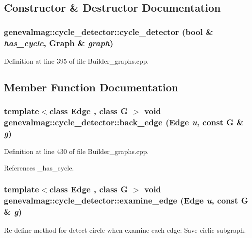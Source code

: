 \subsection{Constructor \& Destructor Documentation}
\hypertarget{structgenevalmag_1_1cycle__detector_ad33c61b557029f98461f984f43a25e2d}{
\subsubsection[{cycle\_\-detector}]{\setlength{\rightskip}{0pt plus 5cm}genevalmag::cycle\_\-detector::cycle\_\-detector (bool \& {\em has\_\-cycle}, \/  {\bf Graph} \& {\em graph})}}
\label{structgenevalmag_1_1cycle__detector_ad33c61b557029f98461f984f43a25e2d}


Definition at line 395 of file Builder\_\-graphs.cpp.



\subsection{Member Function Documentation}
\hypertarget{structgenevalmag_1_1cycle__detector_a9c656f2de80c65c02f061bc75268ea32}{
\subsubsection[{back\_\-edge}]{\setlength{\rightskip}{0pt plus 5cm}template$<$class Edge , class G $>$ void genevalmag::cycle\_\-detector::back\_\-edge (Edge {\em u}, \/  const G \& {\em g})}}
\label{structgenevalmag_1_1cycle__detector_a9c656f2de80c65c02f061bc75268ea32}


Definition at line 430 of file Builder\_\-graphs.cpp.



References \_\-has\_\-cycle.

\hypertarget{structgenevalmag_1_1cycle__detector_a44fccd4a457ae19a0b9fb61cad4f40a7}{
\subsubsection[{examine\_\-edge}]{\setlength{\rightskip}{0pt plus 5cm}template$<$class Edge , class G $>$ void genevalmag::cycle\_\-detector::examine\_\-edge (Edge {\em u}, \/  const G \& {\em g})}}
\label{structgenevalmag_1_1cycle__detector_a44fccd4a457ae19a0b9fb61cad4f40a7}
Re-\/define method for detect circle when examine each edge: Save ciclic subgraph. 

